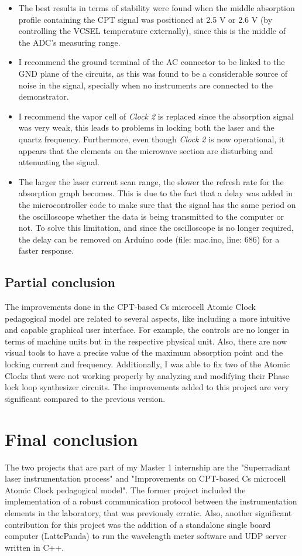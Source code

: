 \documentclass[a4paper,12pt]{article}
\begin{document}
\begin{itemize}
    \item The best results in terms of stability were found when the middle absorption profile containing the CPT signal was positioned at 2.5 V or 2.6 V (by controlling the VCSEL temperature externally), since this is the middle of the ADC's measuring range.
    \item I recommend the ground terminal of the AC connector to be linked to the GND plane of the circuits, as this was found to be a considerable source of noise in the signal, specially when no instruments are connected to the demonstrator.
    \item I recommend the vapor cell of \textit{Clock 2} is replaced since the absorption signal was very weak, this leads to problems in locking both the laser and the quartz frequency. Furthermore, even though \textit{Clock 2} is now operational, it appears that the elements on the microwave section are disturbing and attenuating the signal.
    \item The larger the laser current scan range, the slower the refresh rate for the absorption graph becomes. This is due to the fact that a delay was added in the microcontroller code to make sure that the signal has the same period on the oscilloscope whether the data is being transmitted to the computer or not. To solve this limitation, and since the oscilloscope is no longer required, the delay can be removed on Arduino code (file: mac.ino, line: 686) for a faster response.
\end{itemize}

\subsection{Partial conclusion}
The improvements done in the CPT-based Cs microcell Atomic Clock pedagogical model are related to several aspects, like including a more intuitive and capable graphical user interface. For example, the controls are no longer in terms of machine units but in the respective physical unit. Also, there are now visual tools to have a precise value of the maximum absorption point and the locking current and frequency. Additionally, I was able to fix two of the Atomic Clocks that were not working properly by analyzing and modifying their Phase lock loop synthesizer circuits. The improvements added to this project are very significant compared to the previous version. 
\section{Final conclusion}
The two projects that are part of my Master 1 internship are the "Superradiant laser instrumentation process" and "Improvements on CPT-based Cs microcell Atomic Clock
pedagogical model". The former project included the implementation of a robust communication protocol between the instrumentation elements in the laboratory, that was previously erratic. Also, another significant contribution for this project was the addition of a standalone single board computer (LattePanda) to run the wavelength meter software and UDP server written in C++. 
\end{document}
